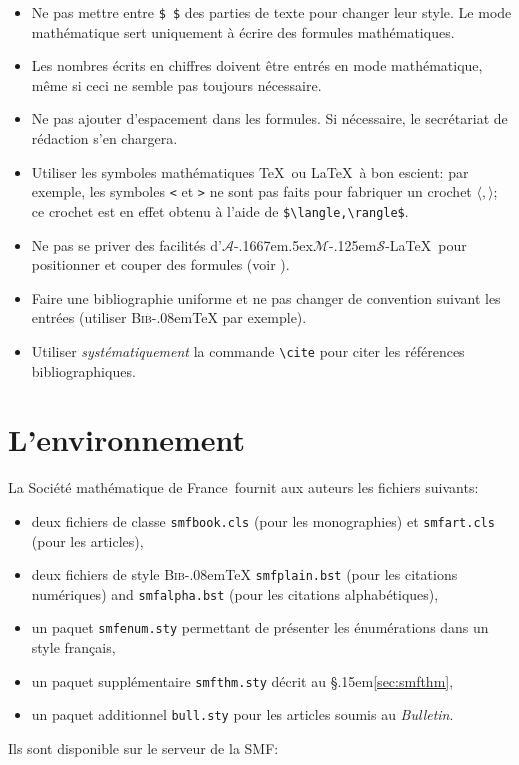 \documentclass[11pt,francais]{smfart}
\newcommand{\SmF}{Soci\'et\'e ma\-th\'e\-ma\-ti\-que de France}
\newcommand{\BibTeX}{{\scshape Bib}\kern-.08em\TeX}
\newcommand{\T}{\S\kern .15em\relax }
\newcommand{\AMS}{$\mathcal{A}$\kern-.1667em\lower.5ex\hbox
        {$\mathcal{M}$}\kern-.125em$\mathcal{S}$}
\begin{document}

\begin{itemize}
\item
Ne pas mettre entre \verb|$ $| des parties de texte pour changer leur style.
Le mode math\'ematique sert uniquement \`a \'ecrire des
formules math\'emati\-ques.

\item
Les nombres \'ecrits en chiffres doivent \^etre entr\'es
en mode math\'ematique, m\^eme si ceci ne semble pas toujours n\'ecessaire.

\item
Ne pas ajouter d'espacement dans les formules.
Si n\'ecessaire, le secr\'eta\-riat de r\'edaction s'en chargera.

\item
Utiliser les symboles math\'ematiques \TeX\ ou \LaTeX\ \`a bon escient: par
exemple, les symboles \verb|<| et \verb|>| ne sont pas faits pour fabriquer
un crochet $\langle,\rangle$; ce crochet est en effet obtenu \`a l'aide de
\verb|$\langle,\rangle$|.

\item
Ne pas se priver des facilit\'es d'\AMS-\LaTeX\ pour positionner
et couper des formules (voir \cite{amslatex}).
\end{itemize}

\begin{itemize}
\item
Faire une bibliographie uniforme et ne pas changer de convention suivant
les entr\'ees (utiliser {\BibTeX} par exemple).
\item
Utiliser {\em syst\'ematiquement} la commande \verb|\cite| pour citer les
r\'ef\'erences bibliographiques.
\end{itemize}

\section{L'environnement}

La \SmF\ fournit aux auteurs les fichiers suivants:
\begin{itemize}
\item
deux fichiers de classe \texttt{smfbook.cls} (pour les monographies) et \texttt{smfart.cls} (pour les articles),
\item
deux fichiers de style {\BibTeX} \texttt{smfplain.bst} (pour les
citations num\'eriques) and \texttt{smfalpha.bst} (pour les citations
alphab\'etiques),
\item
un paquet \texttt{smfenum.sty} permettant de pr\'esenter les 
\'enum\'erations dans un style fran\c cais,
\item
un paquet suppl\'ementaire \texttt{smfthm.sty} d\'ecrit au \T\ref{sec:smfthm},
\item
un paquet additionnel \texttt{bull.sty} pour les articles soumis au \textsl{Bulletin}.
\end{itemize}
Ils sont disponible sur le serveur de la SMF:
\end{document}
